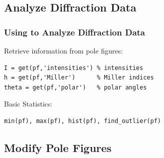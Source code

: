 \subsection*{Analyze Diffraction Data}

\begin{frame}[fragile]
  \frametitle{Using \MTEX to Analyze Diffraction Data}



Retrieve information from pole figures:
\begin{lstlisting}
I = get(pf,'intensities') % intensities
h = get(pf,'Miller')      % Miller indices
theta = get(pf,'polar')   % polar angles
\end{lstlisting}

Basic Statistics:
\begin{lstlisting}
min(pf), max(pf), hist(pf), find_outlier(pf)
\end{lstlisting}


\end{frame}

\subsection*{Modify Pole Figures}


